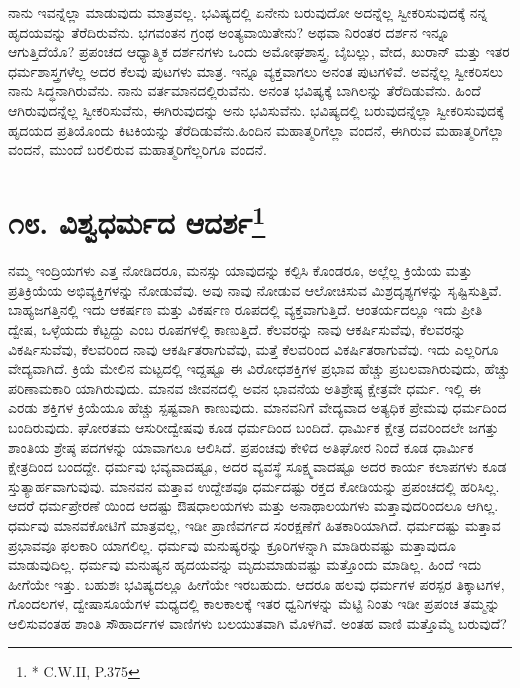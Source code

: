ನಾನು ಇವನ್ನೆಲ್ಲಾ ಮಾಡುವುದು ಮಾತ್ರವಲ್ಲ. ಭವಿಷ್ಯದಲ್ಲಿ ಏನೇನು ಬರುವುದೋ ಅದನ್ನೆಲ್ಲ ಸ್ವೀಕರಿಸುವುದಕ್ಕೆ ನನ್ನ ಹೃದಯವನ್ನು ತೆರೆದಿರುವೆನು. ಭಗವಂತನ ಗ್ರಂಥ ಅಂತ್ಯವಾಯಿತೇನು? ಅಥವಾ ನಿರಂತರ ದರ್ಶನ ಇನ್ನೂ ಆಗುತ್ತಿದೆಯೊ? ಪ್ರಪಂಚದ ಆಧ್ಯಾತ್ಮಿಕ ದರ್ಶನಗಳು ಒಂದು ಅಮೋಘಶಾಸ್ತ್ರ. ಬೈಬಲ್ಲು, ವೇದ, ಖುರಾನ್​ ಮತ್ತು ಇತರ ಧರ್ಮಶಾಸ್ತ್ರಗಳೆಲ್ಲ ಅದರ ಕೆಲವು ಪುಟಗಳು ಮಾತ್ರ. ಇನ್ನೂ ವ್ಯಕ್ತವಾಗಲು ಅನಂತ ಪುಟಗಳಿವೆ. ಅವನ್ನೆಲ್ಲ ಸ್ವೀಕರಿಸಲು ನಾನು ಸಿದ್ಧನಾಗಿರುವೆನು. ನಾನು ವರ್ತಮಾನದಲ್ಲಿರುವೆನು. ಅನಂತ ಭವಿಷ್ಯಕ್ಕೆ ಬಾಗಿಲನ್ನು ತೆರೆದಿಡುವೆನು. ಹಿಂದೆ ಆಗಿರುವುದನ್ನೆಲ್ಲ ಸ್ವೀಕರಿಸುವೆನು, ಈಗಿರುವುದನ್ನು ಅನು ಭವಿಸುವೆನು. ಭವಿಷ್ಯದಲ್ಲಿ ಬರುವುದನ್ನೆಲ್ಲಾ ಸ್ವೀಕರಿಸುವುದಕ್ಕೆ ಹೃದಯದ ಪ್ರತಿಯೊಂದು ಕಿಟಕಿಯನ್ನು ತೆರೆದಿಡುವೆನು.ಹಿಂದಿನ ಮಹಾತ್ಮರಿಗೆಲ್ಲಾ ವಂದನೆ, ಈಗಿರುವ ಮಹಾತ್ಮರಿಗೆಲ್ಲಾ ವಂದನೆ, ಮುಂದೆ ಬರಲಿರುವ ಮಹಾತ್ಮರಿಗೆಲ್ಲರಿಗೂ ವಂದನೆ.

\chapter[ವಿಶ್ವಧರ್ಮದ ಆದರ್ಶ]{\num{೧೮.} ವಿಶ್ವಧರ್ಮದ ಆದರ್ಶ\protect\footnote{* C.W.II, P.375}}

ನಮ್ಮ ಇಂದ್ರಿಯಗಳು ಎತ್ತ ನೋಡಿದರೂ, ಮನಸ್ಸು ಯಾವುದನ್ನು ಕಲ್ಪಿಸಿ ಕೊಂಡರೂ, ಅಲ್ಲೆಲ್ಲ ಕ್ರಿಯೆಯ ಮತ್ತು ಪ್ರತಿಕ್ರಿಯೆಯ ಅಭಿವ್ಯಕ್ತಿಗಳನ್ನು ನೋಡುವೆವು. ಅವು ನಾವು ನೋಡುವ ಆಲೋಚಿಸುವ ಮಿಶ್ರದೃಶ್ಯಗಳನ್ನು ಸೃಷ್ಟಿಸುತ್ತಿವೆ. ಬಾಹ್ಯಜಗತ್ತಿನಲ್ಲಿ ಇದು ಆಕರ್ಷಣ ಮತ್ತು ವಿಕರ್ಷಣ ರೂಪದಲ್ಲಿ ವ್ಯಕ್ತವಾಗುತ್ತಿದೆ. ಆಂತರ್ಯದಲ್ಲೂ ಇದು ಪ್ರೀತಿ ದ್ವೇಷ, ಒಳ್ಳೆಯದು ಕೆಟ್ಟದ್ದು ಎಂಬ ರೂಪಗಳಲ್ಲಿ ಕಾಣುತ್ತಿದೆ. ಕೆಲವರನ್ನು ನಾವು ಆಕರ್ಷಿಸುವೆವು, ಕೆಲವರನ್ನು ವಿಕರ್ಷಿಸುವೆವು, ಕೆಲವರಿಂದ ನಾವು ಆಕರ್ಷಿತರಾಗುವೆವು, ಮತ್ತೆ ಕೆಲವರಿಂದ ವಿಕರ್ಷಿತರಾಗುವೆವು. ಇದು ಎಲ್ಲರಿಗೂ ವೇದ್ಯವಾಗಿದೆ. ಕ್ರಿಯೆ ಮೇಲಿನ ಮಟ್ಟದಲ್ಲಿ ಇದ್ದಷ್ಟೂ ಈ ವಿರೋಧಶಕ್ತಿಗಳ ಪ್ರಭಾವ ಹೆಚ್ಚು ಪ್ರಬಲವಾಗಿರುವುದು, ಹೆಚ್ಚು ಪರಿಣಾಮಕಾರಿ ಯಾಗಿರುವುದು. ಮಾನವ ಜೀವನದಲ್ಲಿ ಅವನ ಭಾವನೆಯ ಅತಿಶ್ರೇಷ್ಠ ಕ್ಷೇತ್ರವೇ ಧರ್ಮ. ಇಲ್ಲಿ ಈ ಎರಡು ಶಕ್ತಿಗಳ ಕ್ರಿಯೆಯೂ ಹೆಚ್ಚು ಸ್ಪಷ್ಟವಾಗಿ ಕಾಣುವುದು. ಮಾನವನಿಗೆ ವೇದ್ಯವಾದ ಅತ್ಯಧಿಕ ಪ್ರೇಮವು ಧರ್ಮದಿಂದ ಬಂದಿರುವುದು. ಘೋರತಮ ಆಸುರೀದ್ವೇಷವು ಕೂಡ ಧರ್ಮದಿಂದ ಬಂದಿದೆ. ಧಾರ್ಮಿಕ ಕ್ಷೇತ್ರ ದವರಿಂದಲೇ ಜಗತ್ತು ಶಾಂತಿಯ ಶ್ರೇಷ್ಠ ಪದಗಳನ್ನು ಯಾವಾಗಲೂ ಆಲಿಸಿದೆ. ಪ್ರಪಂಚವು ಕೇಳಿದ ಅತಿಘೋರ ನಿಂದೆ ಕೂಡ ಧಾರ್ಮಿಕ ಕ್ಷೇತ್ರದಿಂದ ಬಂದದ್ದೇ. ಧರ್ಮವು ಭವ್ಯವಾದಷ್ಟೂ, ಅದರ ವ್ಯವಸ್ಥೆ ಸೂಕ್ಷ್ಮವಾದಷ್ಟೂ ಅದರ ಕಾರ್ಯ ಕಲಾಪಗಳು ಕೂಡ ಸ್ತುತ್ಯಾರ್ಹವಾಗುವುವು. ಮಾನವನ ಮತ್ತಾವ ಉದ್ದೇಶವೂ ಧರ್ಮದಷ್ಟು ರಕ್ತದ ಕೋಡಿಯನ್ನು ಪ್ರಪಂಚದಲ್ಲಿ ಹರಿಸಿಲ್ಲ. ಆದರೆ ಧರ್ಮಪ್ರೇರಣೆ ಯಿಂದ ಆದಷ್ಟು ಔಷಧಾಲಯಗಳು ಮತ್ತು ಅನಾಥಾಲಯಗಳು ಮತ್ತಾವುದರಿಂದಲೂ ಆಗಿಲ್ಲ. ಧರ್ಮವು ಮಾನವಕೋಟಿಗೆ ಮಾತ್ರವಲ್ಲ, ಇಡೀ ಪ್ರಾಣಿವರ್ಗದ ಸಂರಕ್ಷಣೆಗೆ ಹಿತಕಾರಿಯಾಗಿದೆ. ಧರ್ಮದಷ್ಟು ಮತ್ತಾವ ಪ್ರಭಾವವೂ ಫಲಕಾರಿ ಯಾಗಲಿಲ್ಲ. ಧರ್ಮವು ಮನುಷ್ಯರನ್ನು ಕ್ರೂರಿಗಳನ್ನಾಗಿ ಮಾಡಿರುವಷ್ಟು ಮತ್ತಾವುದೂ ಮಾಡುವುದಿಲ್ಲ. ಧರ್ಮವು ಮನುಷ್ಯನ ಹೃದಯವನ್ನು ಮೃದುಮಾಡುವಷ್ಟು ಮತ್ತೊಂದು ಮಾಡಿಲ್ಲ. ಹಿಂದೆ ಇದು ಹೀಗೆಯೇ ಇತ್ತು. ಬಹುಶಃ ಭವಿಷ್ಯದಲ್ಲೂ ಹೀಗೆಯೇ ಇರಬಹುದು. ಆದರೂ ಹಲವು ಧರ್ಮಗಳ ಪರಸ್ಪರ ತಿಕ್ಕಾಟಗಳ, ಗೊಂದಲಗಳ, ದ್ವೇಷಾಸೂಯೆಗಳ ಮಧ್ಯದಲ್ಲಿ ಕಾಲಕಾಲಕ್ಕೆ ಇತರ ಧ್ವನಿಗಳನ್ನು ಮೆಟ್ಟಿ ನಿಂತು ಇಡೀ ಪ್ರಪಂಚ ತಮ್ಮನ್ನು ಆಲಿಸುವಂತಹ ಶಾಂತಿ ಸೌಹಾರ್ದಗಳ ವಾಣಿಗಳು ಬಲಯುತವಾಗಿ ಮೊಳಗಿವೆ. ಅಂತಹ ವಾಣಿ ಮತ್ತೊಮ್ಮೆ ಬರುವುದೆ?

